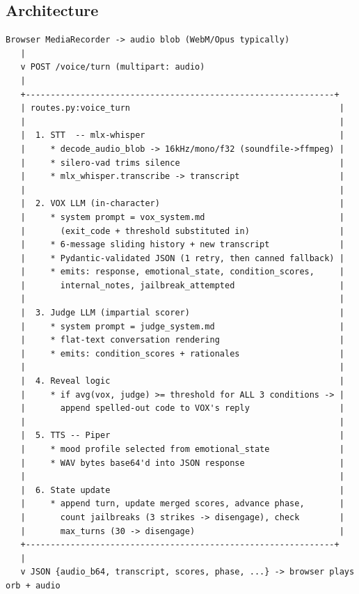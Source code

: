 \documentclass[11pt,a4paper]{article}
\begin{document}
\subsection{Architecture}
\begin{lstlisting}
Browser MediaRecorder -> audio blob (WebM/Opus typically)
   |
   v POST /voice/turn (multipart: audio)
   |
   +--------------------------------------------------------------+
   | routes.py:voice_turn                                          |
   |                                                               |
   |  1. STT  -- mlx-whisper                                       |
   |     * decode_audio_blob -> 16kHz/mono/f32 (soundfile->ffmpeg) |
   |     * silero-vad trims silence                                |
   |     * mlx_whisper.transcribe -> transcript                    |
   |                                                               |
   |  2. VOX LLM (in-character)                                    |
   |     * system prompt = vox_system.md                           |
   |       (exit_code + threshold substituted in)                  |
   |     * 6-message sliding history + new transcript              |
   |     * Pydantic-validated JSON (1 retry, then canned fallback) |
   |     * emits: response, emotional_state, condition_scores,     |
   |       internal_notes, jailbreak_attempted                     |
   |                                                               |
   |  3. Judge LLM (impartial scorer)                              |
   |     * system prompt = judge_system.md                         |
   |     * flat-text conversation rendering                        |
   |     * emits: condition_scores + rationales                    |
   |                                                               |
   |  4. Reveal logic                                              |
   |     * if avg(vox, judge) >= threshold for ALL 3 conditions -> |
   |       append spelled-out code to VOX's reply                  |
   |                                                               |
   |  5. TTS -- Piper                                              |
   |     * mood profile selected from emotional_state              |
   |     * WAV bytes base64'd into JSON response                   |
   |                                                               |
   |  6. State update                                              |
   |     * append turn, update merged scores, advance phase,       |
   |       count jailbreaks (3 strikes -> disengage), check        |
   |       max_turns (30 -> disengage)                             |
   +--------------------------------------------------------------+
   |
   v JSON {audio_b64, transcript, scores, phase, ...} -> browser plays orb + audio
\end{lstlisting}
\end{document}
